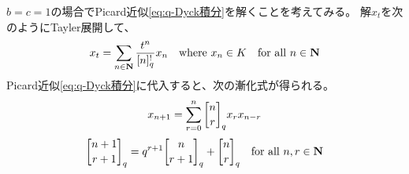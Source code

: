 {	\begin{todo}[微分方程式を解くこと]\label{todo:微分方程式を解くこと} %
		$b=c=1$の場合でPicard近似\eqref{eq:q-Dyck積分}を解くことを考えてみる。
		解$x_t$を次のようにTayler展開して、
		\begin{equation*}\begin{split}
			x_t = \sum_{n\in\mathbf{N}} \frac{t^n}{[n]_q^!}x_n
			\quad\text{where } x_n\in K \quad\text{for all } n\in\mathbf{N}
		\end{split}\end{equation*}
		Picard近似\eqref{eq:q-Dyck積分}に代入すると、次の漸化式が得られる。
		\begin{equation*}\begin{split}
			x_{n+1} = \sum_{r=0}^n \qbinom{n}{r}_q x_rx_{n-r}
		\end{split}\end{equation*}
		\begin{equation*}\begin{split}
			\qbinom{n+1}{r+1}_q = q^{r+1}\qbinom{n}{r+1}_q + \qbinom{n}{r}_q
			\quad\text{for all } n,r\in\sizen
		\end{split}\end{equation*}
	\end{todo} %
}
